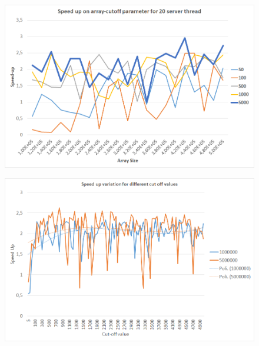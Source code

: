 \documentclass[twocolumn]{article}
\begin{document}
\begin{figure}[h!]
	\centering
	\includegraphics[width=1.0\linewidth]{imgs/SpeedUpAnalysis20ServersArrayAndCutOffAnalysisLINESGraph}
	\caption{}
	\label{fig:speedupanalysis20serversarrayandcutoffanalysislinesgraph}
\end{figure}

\begin{figure}[h!]
	\centering
	\includegraphics[width=1.0\linewidth]{imgs/SpeedUpForDifferentCutOff100-500mila}
	\caption{}
	\label{fig:speedupfordifferentcutoff100-500mila}
	
\end{figure}

	
	

	
\end{document}
